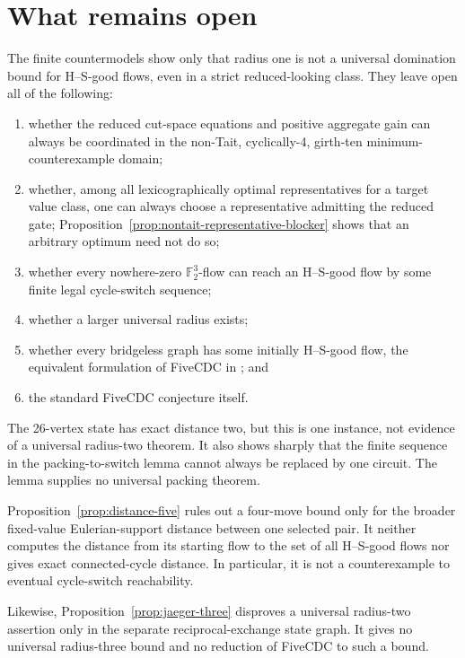 \documentclass[11pt]{article}
\theoremstyle{definition}
\theoremstyle{remark}
\newcommand{\F}{\mathbb F}
\numberwithin{equation}{section}
\begin{document}
\section{What remains open}

The finite countermodels show only that radius one is not a universal
domination bound for H--S-good flows, even in a strict reduced-looking
class.  They leave open all of the following:
\begin{enumerate}
\item whether the reduced cut-space equations and positive aggregate gain
      can always be coordinated in the non-Tait, cyclically-4, girth-ten
      minimum-counterexample domain;
\item whether, among all lexicographically optimal representatives for a
      target value class, one can always choose a representative admitting
      the reduced gate; Proposition~\ref{prop:nontait-representative-blocker}
      shows that an arbitrary optimum need not do so;
\item whether every nowhere-zero \(\F_2^3\)-flow can reach an H--S-good
      flow by some finite legal cycle-switch sequence;
\item whether a larger universal radius exists;
\item whether every bridgeless graph has some initially H--S-good flow,
      the equivalent formulation of FiveCDC in
      \cite{HusekSamal2026}; and
\item the standard FiveCDC conjecture itself.
\end{enumerate}

The 26-vertex state has exact distance two, but this is one instance,
not evidence of a universal radius-two theorem.  It also shows sharply
that the finite sequence in the packing-to-switch lemma cannot always be
replaced by one circuit.  The lemma supplies no universal packing
theorem.

Proposition~\ref{prop:distance-five} rules out a four-move bound only
for the broader fixed-value Eulerian-support distance between one
selected pair.  It neither computes the distance from its starting
flow to the set of all H--S-good flows nor gives exact connected-cycle
distance.  In particular, it is not a counterexample to eventual
cycle-switch reachability.

Likewise, Proposition~\ref{prop:jaeger-three} disproves a universal
radius-two assertion only in the separate reciprocal-exchange state
graph.  It gives no universal radius-three bound and no reduction of
FiveCDC to such a bound.
\end{document}

